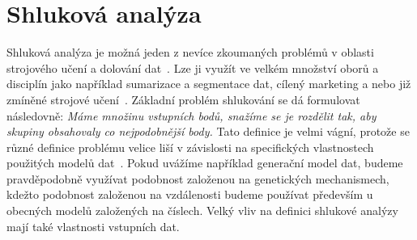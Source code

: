 \chapter{Shluková analýza} \label{sec:clusteranalysis}
Shluková analýza je možná jeden z nevíce zkoumaných problémů v oblasti strojového učení a dolování dat~\cite{Aggarwal13}. Lze ji využít ve velkém množství oborů a disciplín jako například sumarizace a segmentace dat, cílený marketing a nebo již zmíněné strojové učení~\cite{Jain10, Kaufman90}. Základní problém shlukování se dá formulovat následovně: \textit{Máme množinu vstupních bodů, snažíme se je rozdělit tak, aby skupiny obsahovaly co nejpodobnější body.} Tato definice je velmi vágní, protože se různé definice problému velice liší v závislosti na specifických vlastnostech použitých modelů dat~\cite{Aggarwal13}. Pokud uvážíme například generační model dat, budeme pravděpodobně využívat podobnost založenou na genetických mechanismech, kdežto podobnost založenou na vzdálenosti budeme používat především u obecných modelů založených na číslech. Velký vliv na definici shlukové analýzy mají také vlastnosti vstupních dat.



